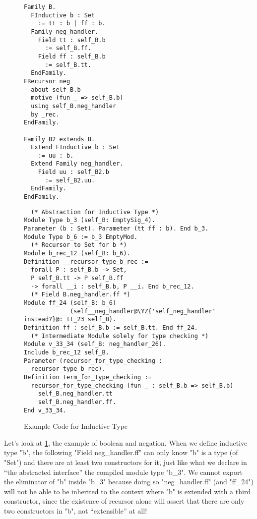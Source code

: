 \begin{figure}[!htb]
  \begin{minipage}[t]{0.3\linewidth}
\begin{verbatim}
Family B.
  FInductive b : Set 
    := tt : b | ff : b.
  Family neg_handler. 
    Field tt : self_B.b 
      := self_B.ff.
    Field ff : self_B.b 
      := self_B.tt.
  EndFamily.
FRecursor neg 
  about self_B.b 
  motive (fun _ => self_B.b)
  using self_B.neg_handler
  by _rec.
EndFamily.

Family B2 extends B.
  Extend FInductive b : Set 
    := uu : b.
  Extend Family neg_handler.
    Field uu : self_B2.b 
      := self_B2.uu.
  EndFamily. 
EndFamily.
\end{verbatim}
  \end{minipage}
  \begin{minipage}[t]{0.65\linewidth}
\begin{verbatim}
  (* Abstraction for Inductive Type *)
Module Type b_3 (self_B: EmptySig_4).
Parameter (b : Set). Parameter (tt ff : b). End b_3.      
Module Type b_6 := b_3 EmptyMod.
  (* Recursor to Set for b *)
Module b_rec_12 (self_B: b_6).
Definition __recursor_type_b_rec :=
  forall P : self_B.b -> Set,
  P self_B.tt -> P self_B.ff 
  -> forall __i : self_B.b, P __i. End b_rec_12. 
  (* Field B.neg_handler.ff *)
Module ff_24 (self_B: b_6) 
             (self__neg_handler@\YZ{'self_neg_handler' instead?}@: tt_23 self_B).
Definition ff : self_B.b := self_B.tt. End ff_24.
  (* Intermediate Module solely for type checking *)
Module v_33_34 (self_B: neg_handler_26).
Include b_rec_12 self_B.
Parameter (recursor_for_type_checking : __recursor_type_b_rec).
Definition term_for_type_checking :=
  recursor_for_type_checking (fun _ : self_B.b => self_B.b)
    self_B.neg_handler.tt
    self_B.neg_handler.ff.  
End v_33_34.
\end{verbatim}
  \end{minipage}
\caption{Example Code for Inductive Type}\label{fig:plugin-example2}
\end{figure}

Let's look at \cref{fig:plugin-example2}, the example of boolean and
negation. When we define inductive type "b", the following "Field
neg_handler.ff" can only know "b" is a type (of "Set") and there are at
least two constructors for it, just like what we declare in ``the
abstracted interface'' the compiled module type "b_3". We cannot export
the eliminator of "b" inside "b_3" because doing so "neg_handler.ff"
(and "ff_24") will not be able to be inherited to the context where "b"
is extended with a third constructor, since the existence of recursor
alone will assert that there are only two constructors in "b", not
``extensible'' at all!

